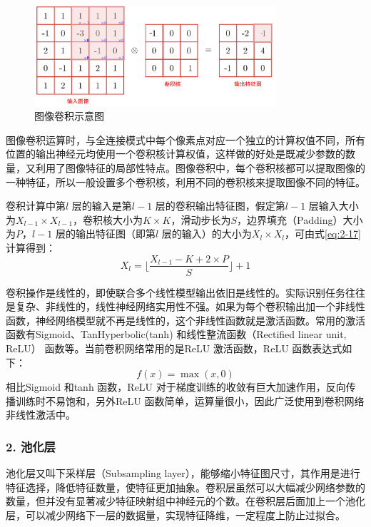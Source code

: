 
\begin{figure}[htbp]
  \centering
  \includegraphics[width=0.8\textwidth]{figures/conv_op}
  \caption{图像卷积示意图}\label{fig:conv_op}
\end{figure}

图像卷积运算时，与全连接模式中每个像素点对应一个独立的计算权值不同，所有位置的输出神经元均使用一个卷积核计算权值，这样做的好处是既减少参数的数量，又利用了图像特征的局部性特点。图像卷积中，每个卷积核都可以提取图像的一种特征，所以一般设置多个卷积核，利用不同的卷积核来提取图像不同的特征。

卷积计算中第$l$ 层的输入是第$l-1$ 层的卷积输出特征图，假定第$l-1$ 层输入大小为$X_{l-1} \times X_{l-1}$，卷积核大小为$K \times K$，滑动步长为$S$，边界填充（Padding）大小为$P$，$l-1$ 层的输出特征图（即第$l$ 层的输入）的大小为$X_l \times X_l$，可由式\ref{eq:2-17} 计算得到：
\begin{equation}
  \label{eq:2-17}
  X_l = \lfloor \frac{X_{l-1} - K + 2 \times P}{S} \rfloor + 1
\end{equation}

卷积操作是线性的，即使联合多个线性模型输出依旧是线性的。实际识别任务往往是复杂、非线性的，线性神经网络实用性不强。如果为每个卷积输出加一个非线性函数，神经网络模型就不再是线性的，这个非线性函数就是激活函数。常用的激活函数有Sigmoid、TanHyperbolic(tanh) 和线性整流函数（Rectified linear unit, ReLU） 函数等。当前卷积网络常用的是ReLU 激活函数，ReLU 函数表达式如下：
\begin{equation}
  \label{eq:2-17-1}
  f(x) = \max(x,0)
\end{equation}
相比Sigmoid 和tanh 函数，ReLU 对于梯度训练的收敛有巨大加速作用，反向传播训练时不易饱和，另外ReLU 函数简单，运算量很小，因此广泛使用到卷积网络非线性激活中。

\subsubsection*{2. 池化层}
\label{subsec:chap02-2-1-2}
池化层又叫下采样层（Subsampling layer），能够缩小特征图尺寸，其作用是进行特征选择，降低特征数量，使特征更加抽象。卷积层虽然可以大幅减少网络参数的数量，但并没有显著减少特征映射组中神经元的个数。在卷积层后面加上一个池化层，可以减少网络下一层的数据量，实现特征降维，一定程度上防止过拟合。

